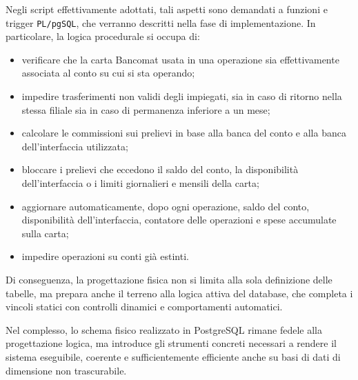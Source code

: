 Negli script effettivamente adottati, tali aspetti sono demandati a funzioni e trigger \texttt{PL/pgSQL}, che verranno descritti nella fase di implementazione. In particolare, la logica procedurale si occupa di:
\begin{itemize}
    \item verificare che la carta Bancomat usata in una operazione sia effettivamente associata al conto su cui si sta operando;
    \item impedire trasferimenti non validi degli impiegati, sia in caso di ritorno nella stessa filiale sia in caso di permanenza inferiore a un mese;
    \item calcolare le commissioni sui prelievi in base alla banca del conto e alla banca dell'interfaccia utilizzata;
    \item bloccare i prelievi che eccedono il saldo del conto, la disponibilità dell'interfaccia o i limiti giornalieri e mensili della carta;
    \item aggiornare automaticamente, dopo ogni operazione, saldo del conto, disponibilità dell'interfaccia, contatore delle operazioni e spese accumulate sulla carta;
    \item impedire operazioni su conti già estinti.
\end{itemize}

Di conseguenza, la progettazione fisica non si limita alla sola definizione delle tabelle, ma prepara anche il terreno alla logica attiva del database, che completa i vincoli statici con controlli dinamici e comportamenti automatici.

Nel complesso, lo schema fisico realizzato in PostgreSQL rimane fedele alla progettazione logica, ma introduce gli strumenti concreti necessari a rendere il sistema eseguibile, coerente e sufficientemente efficiente anche su basi di dati di dimensione non trascurabile.
